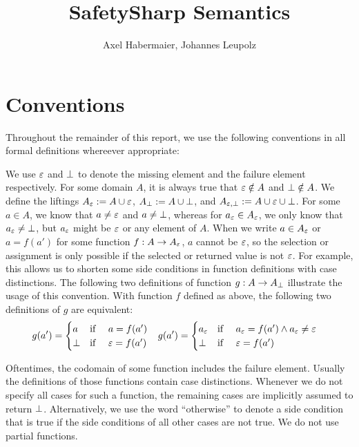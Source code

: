 \documentclass[a4paper,10pt,english]{article}
\title{SafetySharp Semantics}
\author{Axel Habermaier, Johannes Leupolz}
\begin{document}
\maketitle

\section{Conventions}
Throughout the remainder of this report, we use the following conventions in all formal definitions whereever appropriate:

	We use $\varepsilon$ and $\bot$ to denote the missing element and the failure element respectively. For some domain $A$, it is
	always true that $\varepsilon \notin A$ and $\bot \notin A$. We define the liftings $A_\varepsilon := A \cup
	\varepsilon$, $A_\bot := A \cup \bot$, and $A_{\varepsilon, \bot} := A \cup \varepsilon \cup	\bot$.
	For some $a \in A$, we know that $a \neq \varepsilon$ and $a \neq \bot$, whereas for $a_\varepsilon \in
	A_\varepsilon$, we only know that $a_\varepsilon \neq \bot$, but $a_\varepsilon$ might be $\varepsilon$ or
	any element of $A$. When we write $a \in A_\varepsilon$ or $a = f(a')$ for some function $f : A \rightarrow
	A_\varepsilon$, $a$ cannot be $\varepsilon$, so the selection or assignment is only possible if the selected or
	returned value is not $\varepsilon$. For example, this allows us to shorten some side conditions in function definitions with case
	distinctions. The following two definitions of function $g : A \rightarrow A_\bot$ illustrate the usage of this
	convention.
	With function $f$ defined as above, the following two definitions of $g$ are equivalent:
	\begin{align*}
		g(a') = \begin{cases}
			a & \text{if } \quad a = f(a') \\
			\bot & \text{if } \quad \varepsilon = f(a')
		\end{cases}
		&&&
		g(a') = \begin{cases}
			a_\varepsilon & \text{if } \quad a_\varepsilon = f(a') \wedge a_\varepsilon \neq \varepsilon	\\
			\bot & \text{if } \quad \varepsilon = f(a')
		\end{cases}
	\end{align*}

	Oftentimes, the codomain of some function includes the failure element. Usually the definitions of those functions contain case distinctions.
	Whenever we do not specify all cases for such a function, the remaining cases are implicitly assumed to return $\bot$.
	Alternatively, we use the word ``otherwise'' to denote a side condition that is true if the side conditions of all other cases are not true. We do not use partial functions.
\end{document}
